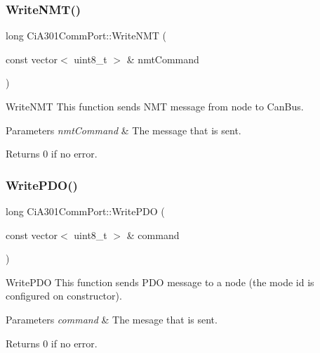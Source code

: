 \mbox{\label{classCiA301CommPort_a09feb3f78831c9fbb683a85cc3bc4562}} 
\subsubsection{\texorpdfstring{Write\+N\+M\+T()}{WriteNMT()}}
{\footnotesize\ttfamily long Ci\+A301\+Comm\+Port\+::\+Write\+N\+MT (\begin{DoxyParamCaption}\item[{const vector$<$ uint8\+\_\+t $>$ \&}]{nmt\+Command }\end{DoxyParamCaption})}



Write\+N\+MT This function sends N\+MT message from node to Can\+Bus. 


\begin{DoxyParams}{Parameters}
{\em nmt\+Command} & The message that is sent. \\
\hline
\end{DoxyParams}
\begin{DoxyReturn}{Returns}
0 if no error. 
\end{DoxyReturn}
\mbox{\label{classCiA301CommPort_a56d2c604b11363e6b287f59b68a546bd}} 
\subsubsection{\texorpdfstring{Write\+P\+D\+O()}{WritePDO()}}
{\footnotesize\ttfamily long Ci\+A301\+Comm\+Port\+::\+Write\+P\+DO (\begin{DoxyParamCaption}\item[{const vector$<$ uint8\+\_\+t $>$ \&}]{command }\end{DoxyParamCaption})}



Write\+P\+DO This function sends P\+DO message to a node (the mode id is configured on constructor). 


\begin{DoxyParams}{Parameters}
{\em command} & The mesage that is sent. \\
\hline
\end{DoxyParams}
\begin{DoxyReturn}{Returns}
0 if no error. 
\end{DoxyReturn}
\mbox{\label{classCiA301CommPort_a1faf4f37530e0dd0ae4600cfb0b1d742}} 
